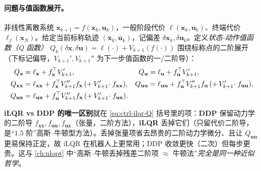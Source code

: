 \paragraph{问题与值函数展开。}
非线性离散系统 $\mathbf{x}_{k+1}=f(\mathbf{x}_k,\mathbf{u}_k)$，一般阶段代价 $\ell(\mathbf{x}_k,\mathbf{u}_k)$、终端代价 $\ell_f(\mathbf{x}_N)$。给定当前标称轨迹 $(\bar{\mathbf{x}}_k,\bar{\mathbf{u}}_k)$，记偏差 $\delta\mathbf{x}_k,\delta\mathbf{u}_k$。定义\emph{状态-动作值函数（Q 函数）} $Q_k(\delta\mathbf{x},\delta\mathbf{u})=\ell(\cdot)+V_{k+1}(f(\cdot))$ 围绕标称点的二阶展开\cite{tedrake_underactuated}（下标记偏导，$V_{k+1}',V_{k+1}''$ 为下一步值函数的一/二阶导）：
\begin{align}
  Q_{\mathbf{x}}&=\ell_{\mathbf{x}}+f_{\mathbf{x}}^\top V_{k+1}', &
  Q_{\mathbf{u}}&=\ell_{\mathbf{u}}+f_{\mathbf{u}}^\top V_{k+1}', \notag\\
  Q_{\mathbf{x}\mathbf{x}}&=\ell_{\mathbf{x}\mathbf{x}}+f_{\mathbf{x}}^\top V_{k+1}''f_{\mathbf{x}}\,(+\,V_{k+1}'\!\cdot f_{\mathbf{x}\mathbf{x}}), &
  Q_{\mathbf{u}\mathbf{u}}&=\ell_{\mathbf{u}\mathbf{u}}+f_{\mathbf{u}}^\top V_{k+1}''f_{\mathbf{u}}\,(+\,V_{k+1}'\!\cdot f_{\mathbf{u}\mathbf{u}}), \notag\\
  Q_{\mathbf{u}\mathbf{x}}&=\ell_{\mathbf{u}\mathbf{x}}+f_{\mathbf{u}}^\top V_{k+1}''f_{\mathbf{x}}\,(+\,V_{k+1}'\!\cdot f_{\mathbf{u}\mathbf{x}}). &&
  \label{eq:ctrl-ilqr-Q}
\end{align}

\begin{insight}
\textbf{iLQR vs DDP 的唯一区别}就在 \cref{eq:ctrl-ilqr-Q} 括号里的项：\textbf{DDP} 保留动力学的二阶导 $f_{\mathbf{x}\mathbf{x}},f_{\mathbf{u}\mathbf{u}},f_{\mathbf{u}\mathbf{x}}$（张量，二阶方法），\textbf{iLQR} 丢掉它们（只留代价二阶导，是“$1.5$ 阶”高斯--牛顿型方法）。丢掉张量项省去昂贵的二阶动力学微分、且让 $Q_{\mathbf{u}\mathbf{u}}$ 更易保持正定，故 iLQR 在机器人上更常用；DDP 收敛更快（二次）但每步更贵。这与 \cref{ch:nlopt} 中“高斯--牛顿丢掉残差二阶项 $\approx$ 牛顿法”\emph{完全是同一种近似哲学}。
\end{insight}

